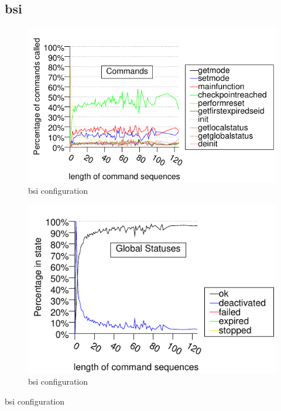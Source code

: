 \subsection{bsi}
\begin{figure}[h!]
\label{FIG:COMMANDS_BSI}
\caption{bsi configuration}
\begin{center}
\includegraphics{generated_pictures/history_commands_bsi.pdf}
\end{center}
\end{figure}

\begin{figure}[h!]
\label{FIG:STATUSES_BSI}
\caption{bsi configuration}
\begin{center}
\includegraphics{generated_pictures/history_statuses_bsi.pdf}
\end{center}
\end{figure}

\begin{table}[h!]
\label{TABLE:STATUSES_BSI}

\caption{bsi configuration}
\end{table}

